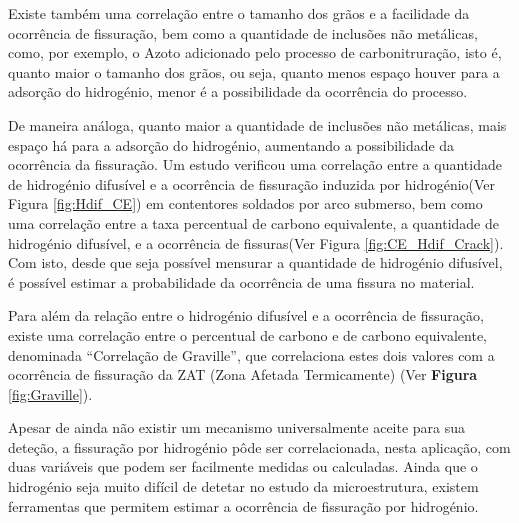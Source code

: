 \newpage
\par
Existe também uma correlação entre o tamanho dos grãos e a facilidade da ocorrência de fissuração\cite{Seo2008}, bem como a quantidade de inclusões não metálicas, como, por exemplo, o Azoto adicionado pelo processo de carbonitruração, isto é, quanto maior o tamanho dos grãos, ou seja, quanto menos espaço houver para a adsorção do hidrogénio, menor é a possibilidade da ocorrência do processo.
\par
De maneira análoga, quanto maior a quantidade de inclusões não metálicas, mais espaço há para a adsorção do hidrogénio, aumentando a possibilidade da ocorrência da fissuração. Um estudo verificou uma correlação entre a quantidade de hidrogénio difusível e a ocorrência de fissuração induzida por hidrogénio\cite{Santos2021}(Ver Figura \ref{fig:Hdif_CE}) em contentores soldados por arco submerso, bem como uma correlação entre a taxa percentual de carbono equivalente, a quantidade de hidrogénio difusível, e a ocorrência de fissuras(Ver Figura \ref{fig:CE_Hdif_Crack}). Com isto, desde que seja possível mensurar a quantidade de hidrogénio difusível, é possível estimar a probabilidade da ocorrência de uma fissura no material.
\par
Para além da relação entre o hidrogénio difusível e a ocorrência de fissuração, existe uma correlação entre o percentual de carbono e de carbono equivalente, denominada “Correlação de Graville”, que correlaciona estes dois valores com a ocorrência de fissuração da ZAT (Zona Afetada Termicamente) (Ver \textbf{Figura} \ref{fig:Graville})\cite{Olson2007}.

\par
Apesar de ainda não existir um mecanismo universalmente aceite para sua deteção, a fissuração por hidrogénio pôde ser correlacionada, nesta aplicação, com duas variáveis que podem ser facilmente medidas ou calculadas. Ainda que o hidrogénio seja muito difícil de detetar no estudo da microestrutura, existem ferramentas que permitem estimar a ocorrência de fissuração por hidrogénio.
